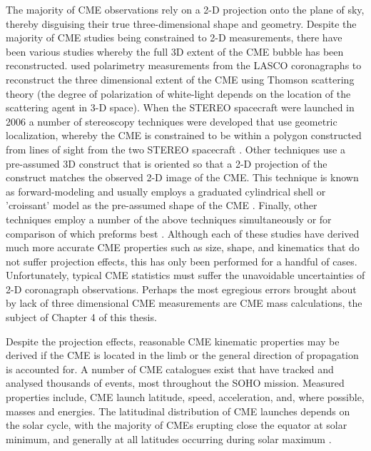 The majority of CME observations rely on a 2-D projection onto the plane of sky, thereby  disguising their true three-dimensional shape and geometry. Despite the majority of CME studies being constrained to 2-D measurements, there have been various studies whereby the full 3D extent of the CME bubble has been reconstructed. \citep{moran2004} used polarimetry measurements from the LASCO coronagraphs to reconstruct the three dimensional extent of the CME using Thomson scattering theory (the degree of polarization of white-light depends on the location of the scattering agent in 3-D space). When the STEREO spacecraft were launched in 2006 a number of stereoscopy techniques were developed that use geometric localization, whereby the CME is constrained to be within a polygon constructed from lines of sight from the two STEREO spacecraft \citep{dekon2009, byrne2010}. Other techniques use a pre-assumed 3D construct that is oriented so that a 2-D projection of the construct matches the observed 2-D image of the CME. This technique is known as forward-modeling and usually employs a graduated cylindrical shell or 'croissant' model as the pre-assumed shape of the CME \citep{thern2006}. Finally, other techniques employ a number of the above techniques simultaneously or for comparison of which preforms best \citep{mierla2009}. Although each of these studies have derived much more accurate CME properties such as size, shape, and kinematics that do not suffer projection effects, this has only been performed for a handful of cases. Unfortunately, typical CME statistics must suffer the unavoidable uncertainties of 2-D coronagraph observations. Perhaps the most egregious errors brought about by lack of three dimensional CME measurements are CME mass calculations, the subject of Chapter 4 of this thesis.

Despite the projection effects, reasonable CME kinematic properties may be derived if the CME is located in the limb or the general direction of propagation is accounted for. A number of CME catalogues exist that have tracked and analysed thousands of events, most throughout the SOHO mission. Measured properties include, CME launch latitude, speed, acceleration, and, where possible, masses and energies. The latitudinal distribution of CME launches depends on the solar cycle, with the majority of CMEs erupting close the equator at solar minimum, and generally at all latitudes occurring during solar maximum \citep{yashiro2004}.


